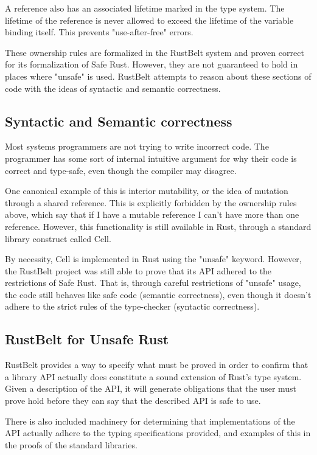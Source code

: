 \documentclass[12pt]{article}
\begin{document}
A reference also has an associated lifetime marked in the type system. The lifetime of the reference is never allowed to exceed the lifetime of the variable binding itself. This prevents "use-after-free" errors.

These ownership rules are formalized in the RustBelt system and proven correct for its formalization of Safe Rust. However, they are not guaranteed to hold in places where "unsafe" is used. RustBelt attempts to reason about these sections of code with the ideas of syntactic and semantic correctness.

\subsection{Syntactic and Semantic correctness}
Most systems programmers are not trying to write incorrect code. The programmer has some sort of internal intuitive argument for why their code is correct and type-safe, even though the compiler may disagree.

One canonical example of this is interior mutability, or the idea of mutation through a shared reference. This is explicitly forbidden by the ownership rules above, which say that if I have a mutable reference I can't have more than one reference. However, this functionality is still available in Rust, through a standard library construct called Cell.

By necessity, Cell is implemented in Rust using the "unsafe" keyword. However, the RustBelt project was still able to prove that its API adhered to the restrictions of Safe Rust. That is, through careful restrictions of "unsafe" usage, the code still behaves like safe code (semantic correctness), even though it doesn't adhere to the strict rules of the type-checker (syntactic correctness).

\subsection{RustBelt for Unsafe Rust}
RustBelt provides a way to specify what must be proved in order to confirm that a library API actually does constitute a sound extension of Rust's type system. Given a description of the API, it will generate obligations that the user must prove hold before they can say that the described API is safe to use.

There is also included machinery for determining that implementations of the API actually adhere to the typing specifications provided, and examples of this in the proofs of the standard libraries.
\end{document}
